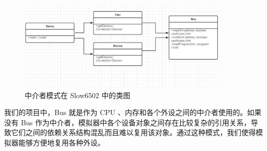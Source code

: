 \begin{figure}[H]
    \centering
    \includegraphics[width=0.9\textwidth]{figures/中介者模式.pdf}
    \caption{中介者模式在 Slow6502 中的类图}
\end{figure}

我们的项目中，Bus 就是作为 CPU 、内存和各个外设之间的中介者使用的。如果没有 Bus 作为中介者，模拟器中各个设备对象之间存在比较复杂的引用关系，导致它们之间的依赖关系结构混乱而且难以复用该对象。通过这种模式，我们使得模拟器能够方便地复用各种外设。

  